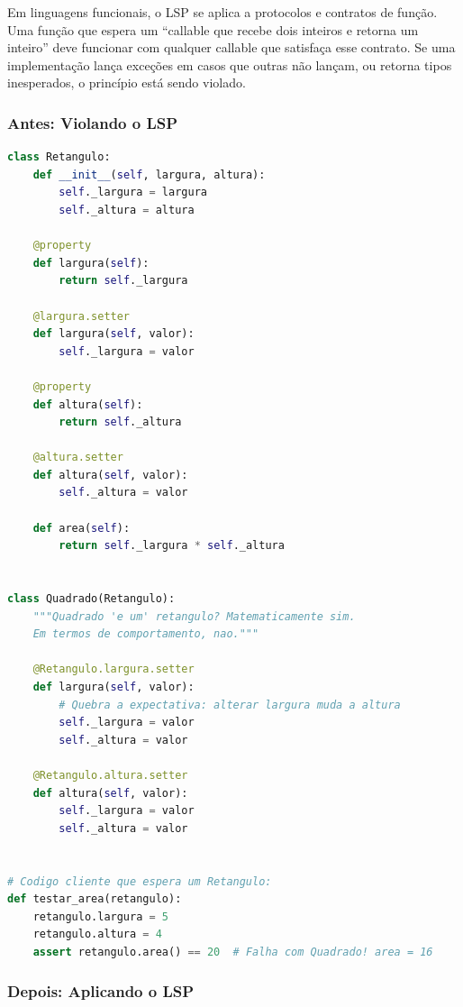 Em linguagens funcionais, o LSP se aplica a protocolos e contratos de função.
Uma função que espera um ``callable que recebe dois inteiros e retorna um
inteiro'' deve funcionar com qualquer callable que satisfaça esse contrato.
Se uma implementação lança exceções em casos que outras não lançam, ou retorna
tipos inesperados, o princípio está sendo violado.

\subsubsection{Antes: Violando o LSP}

\begin{lstlisting}[language=Python, caption={Violação do LSP: subclasse quebra o contrato da base}]
class Retangulo:
    def __init__(self, largura, altura):
        self._largura = largura
        self._altura = altura

    @property
    def largura(self):
        return self._largura

    @largura.setter
    def largura(self, valor):
        self._largura = valor

    @property
    def altura(self):
        return self._altura

    @altura.setter
    def altura(self, valor):
        self._altura = valor

    def area(self):
        return self._largura * self._altura


class Quadrado(Retangulo):
    """Quadrado 'e um' retangulo? Matematicamente sim.
    Em termos de comportamento, nao."""

    @Retangulo.largura.setter
    def largura(self, valor):
        # Quebra a expectativa: alterar largura muda a altura
        self._largura = valor
        self._altura = valor

    @Retangulo.altura.setter
    def altura(self, valor):
        self._largura = valor
        self._altura = valor


# Codigo cliente que espera um Retangulo:
def testar_area(retangulo):
    retangulo.largura = 5
    retangulo.altura = 4
    assert retangulo.area() == 20  # Falha com Quadrado! area = 16
\end{lstlisting}

\subsubsection{Depois: Aplicando o LSP}

